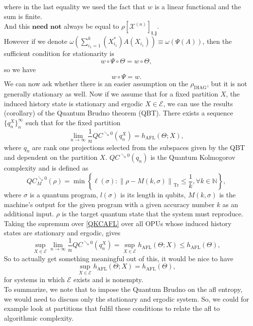 \documentclass{article}
\newcommand{\rdiag}{\rho_{\text{DIAG}}}
\begin{document}
where in the last equality we used the fact that $w$ is a linear functional and the sum is finite.\\
And this $\textbf{need not}$ always be equal to $\rho[\mathcal{X}^{(n)}]_{\mathbf{i},\mathbf{j}}$.\\
However if we denote $\omega\!\left(\sum_{i_1=1}^k (X_{i_1}^*)A(X_{i_1})\right) \equiv \omega\!\left(\Psi(A)\right)$, then the sufficient condition for stationarity is 
\begin{equation}
    w\circ\Psi\circ\Theta = w\circ\Theta,
\end{equation}
so we have 
\begin{equation}
    w\circ\Psi = w.
\end{equation}
We can now ask whether there is an easier assumption on the $\rdiag$, but it is not generally stationary as well. 
Now if we assume that for a fixed partition $X$, the induced history state is stationary and ergodic $X \in \mathcal{E}$, we can use the results (corollary) of the Quantum Brudno theorem (QBT). There exists a sequence $\{q_n^X\}_n^\infty$ such that for the fixed partition
\begin{equation}
    	\label{QKCAFL}
    \lim_{n\to\infty}
    \frac{1}{n}QC^{\searrow 0}(q_n^X)=
    h_{\mathrm{AFL}}(\Theta;X),
\end{equation}
where $q_n$ are rank one projections selected from the subspaces given by the QBT and dependent on the partition $X$.   $QC^{\searrow 0}(q_n)$ is the Quantum Kolmogorov complexity and is defined as 
\begin{equation}
    QC_M^{\searrow 0}(\rho)
    =
    \min\left\{
        \ell(\sigma):
        \left\|\rho-M(k,\sigma)\right\|_{\mathrm{Tr}}
        \leq \frac{1}{k}, \forall k\in\mathbb{N}
    \right\},
\end{equation}
where $\sigma$ is a quantum program, $l(\sigma)$ is its length in qubits, $M(k,\sigma)$ is the machine's output for the given program with a given accuracy number $k$ as an additional input. $\rho$ is the target quantum state that the system must reproduce. \\
Taking the supremum over \eqref{QKCAFL} over all OPUs whose induced history states are stationary and ergodic, gives
\begin{equation}
    	\label{QKCAFLSUP}
    \sup_{X\in\mathcal{E}}\lim_{n\to\infty}
    \frac{1}{n}QC^{\searrow 0}(q_n^X)=\sup_{X\in\mathcal{E}}
    h_{\mathrm{AFL}}(\Theta;X)\leq h_{\mathrm{AFL}}(\Theta),
\end{equation}
So to actually get something meaningful out of this, it would be nice to have
\begin{equation}
    \sup_{X\in\mathcal{E}}
    h_{\mathrm{AFL}}(\Theta;X)= h_{\mathrm{AFL}}(\Theta),
\end{equation}
for systems in which $\mathcal{E}$ exists and is nonempty.\\
To summarize, we note that to impose the Quantum Brudno on the afl entropy, we would need to discuss only the stationary and ergodic system. So, we could for example look at partitions that fulfil these conditions to relate the afl to algorithmic complexity. 
\end{document}
